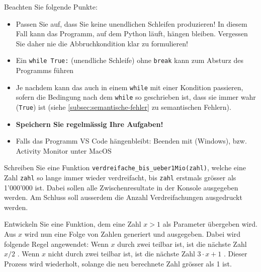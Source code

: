 \begin{myattention}
	Beachten Sie folgende Punkte:
	\begin{itemize}
		\item Passen Sie auf, dass Sie keine unendlichen Schleifen produzieren! In diesem Fall kann das Programm, auf dem Python läuft, hängen bleiben. Vergessen Sie daher nie die Abbruchkondition klar zu formulieren!
		\item Ein \lstinline|while True:| (unendliche Schleife) ohne \lstinline|break| kann zum Absturz des Programms führen 
		\item Je nachdem kann das auch in einem \lstinline|while| mit einer Kondition passieren, sofern die Bedingung nach dem \lstinline|while| so geschrieben ist, dass sie immer wahr (\lstinline|True|) ist (siehe \cref{subsec:semantische-fehler} zu semantischen Fehlern).
		\item \textbf{Speichern Sie regelmässig Ihre Aufgaben!}
		\item Falls das Programm VS Code hängenbleibt: Beenden mit  (Windows), bzw. Activity Monitor unter MacOS
	\end{itemize}
\end{myattention}

\begin{myexercise}
	Schreiben Sie eine Funktion \lstinline|verdreifache_bis_ueber1Mio(zahl)|, welche eine Zahl \texttt{zahl} so lange immer wieder verdreifacht, bis \texttt{zahl} erstmals grösser als 1'000'000 ist. Dabei sollen alle Zwischenresultate in der Konsole ausgegeben werden. Am Schluss soll ausserdem die Anzahl Verdreifachungen ausgedruckt werden.
	\begin{myanswer}
		
	\end{myanswer}
\end{myexercise}

\begin{myexercise}
	Entwickeln Sie eine Funktion, dem eine Zahl $x > 1$ als Parameter übergeben wird. Aus $x$ wird nun eine Folge von Zahlen generiert und ausgegeben. Dabei wird folgende Regel angewendet: Wenn $x$ durch zwei teilbar ist, ist die nächste Zahl $x / 2$ . Wenn $x$ nicht durch zwei teilbar ist, ist die nächste Zahl $3 \cdot x + 1$ . Dieser Prozess wird wiederholt, solange die neu berechnete Zahl grösser als 1 ist.
	\begin{myanswer}
		
	\end{myanswer}
\end{myexercise}

